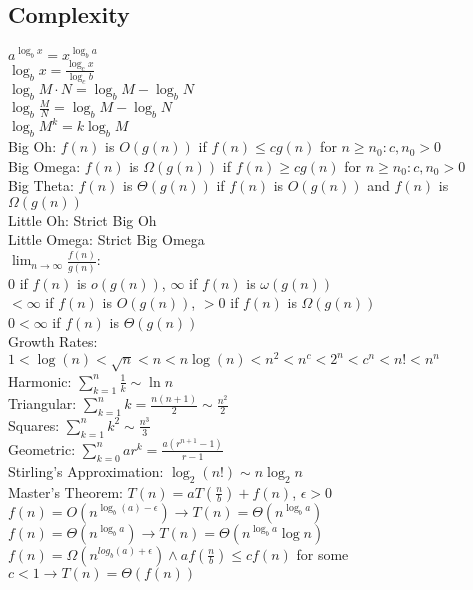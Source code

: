 \documentclass{article}
\begin{document}
\begin{multicols*}{2}
        \subsection*{Complexity}
        $a^{\log_b x} = x^{\log_b a}$\\
        $\log_b x = \frac{\log_c x}{\log_c b}$\\
        $\log_b M \cdot N = \log_b M - \log_b N$\\
        $\log_b \frac{M}{N} = \log_b M - \log_b N$\\
        $\log_b M^k = k\log_b M$\\
        Big Oh: $f(n)$ is $O(g(n))$ if $f(n) \leq cg(n)$ for $n \geq n_0 : c, n_0 > 0$\\
        Big Omega: $f(n)$ is $\Omega(g(n))$ if $f(n) \geq cg(n)$ for $n \geq n_0 : c, n_0 > 0$\\
        Big Theta: $f(n)$ is $\Theta(g(n))$ if $f(n)$ is $O(g(n))$ and $f(n)$ is $\Omega(g(n))$\\
        Little Oh: Strict Big Oh\\
        Little Omega: Strict Big Omega\\
        $\lim_{n\to\infty}\frac{f(n)}{g(n)}$:\\
        0 if $f(n)$ is $o(g(n))$, $\infty$ if $f(n)$ is $\omega(g(n))$\\
        $< \infty$ if $f(n)$ is $O(g(n))$, $> 0$ if $f(n)$ is $\Omega(g(n))$\\
        $0 < \infty$ if $f(n)$ is $\Theta(g(n))$\\
        Growth Rates: $1 < \log(n) < \sqrt{n} < n < n\log(n) < n^2 < n^c < 2^n < c^n < n! < n^n$\\
        Harmonic: $\sum_{k=1}^{n} \frac{1}{k} \sim \ln n$\\
        Triangular: $\sum_{k=1}^{n} k = \frac{n(n + 1)}{2} \sim \frac{n^2}{2}$\\
        Squares: $\sum_{k=1}^{n} k^2 \sim \frac{n^3}{3}$\\
        Geometric: $\sum_{k=0}^{n} ar^k = \frac{a(r^{n+1} - 1)}{r - 1}$\\
        Stirling's Approximation: $\log_2(n!) \sim n\log_2 n$\\
        Master's Theorem: $T(n) = aT(\frac{n}{b}) + f(n)$, $\epsilon > 0$\\
        $f(n) = O(n^{\log_b (a) - \epsilon}) \to T(n) = \Theta(n^{\log_b a})$\\
        $f(n) = \Theta(n^{\log_b a}) \to T(n) = \Theta(n^{\log_b a}\log n)$\\
        $f(n) = \Omega(n^{log_b (a) + \epsilon}) \wedge af(\frac{n}{b}) \leq cf(n)$ for some $c
        < 1 \to T(n) = \Theta(f(n))$

\end{multicols*}
\end{document}
